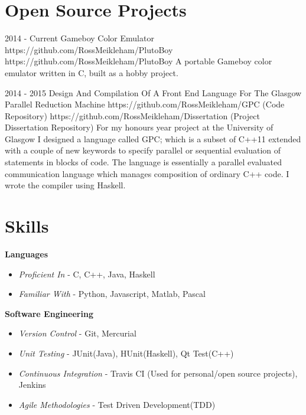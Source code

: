 \documentclass[10pt]{article} %
\begin{document}


\section{Open Source Projects}
\job
{2014 - }{Current}
{Gameboy Color Emulator}
{https://github.com/RossMeikleham/PlutoBoy}
{https://github.com/RossMeikleham/PlutoBoy}
{A portable Gameboy color emulator written in C, built as a hobby project.} 


\jobtwo
{2014 - }{2015}
{Design And Compilation Of A Front End Language For The Glasgow Parallel Reduction Machine}
{}
{https://github.com/RossMeikleham/GPC (Code Repository)}
{https://github.com/RossMeikleham/Dissertation (Project Dissertation Repository)}
{For my honours year project at the University of Glasgow I designed a language called GPC; which is a subset of C++11 extended with a couple of new keywords to specify parallel or sequential evaluation of statements in blocks of code. The language is essentially a parallel evaluated communication language which manages composition of ordinary C++ code. I wrote the compiler using Haskell.}
    

\section{Skills}
\bf{Languages}
\begin{itemize}
\item \textit{Proficient In} - C, C++, Java, Haskell
\item \textit{Familiar With}  - Python, Javascript, Matlab, Pascal
\end{itemize}

\bf{Software Engineering}
\begin{itemize}
\item \textit{Version Control} - Git, Mercurial
\item \textit{Unit Testing} - JUnit(Java), HUnit(Haskell), Qt Test(C++)
\item \textit{Continuous Integration} - Travis CI (Used for personal/open source projects),  Jenkins
\item \textit{Agile Methodologies} - Test Driven Development(TDD)
\end{itemize}
\end{document}
